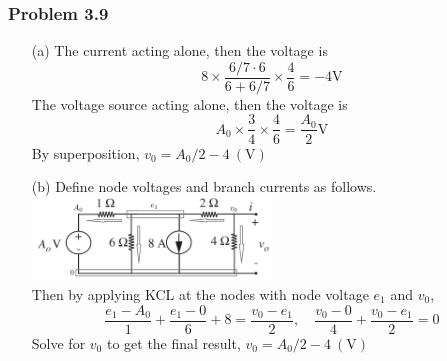 \documentclass[13pt]{article}
\begin{document}
\subsubsection*{Problem 3.9}
\begin{itemize}
\item[(a)] The current acting alone, then the voltage is $$8 \times \frac{6/7 \cdot 6}{6 + 6/7}\times \frac{4}{6} = -4\mathrm{V}$$
The voltage source acting alone, then the voltage is $$A_0\times \frac{3}{4}\times \frac{4}{6} = \frac{A_0}{2} \mathrm{V}$$
By superposition, $\boxed{v_0 = A_0/2 - 4 \:(\mathrm{V})}$
\item[(b)] Define node voltages and branch currents as follows. \\
\includegraphics[width=0.5\textwidth, center]{p3_9}\\
Then by applying KCL at the nodes with node voltage $e_1$ and $v_0$, $$\frac{e_1-A_0}{1}+\frac{e_1 - 0}{6} + 8 = \frac{v_0-e_1}{2}, \quad \frac{v_0-0}{4} + \frac{v_0-e_1}{2} = 0$$
Solve for $v_0$ to get the final result, $\boxed{v_0 = A_0/2 - 4 \:(\mathrm{V})}$
\end{itemize}
\end{document}
